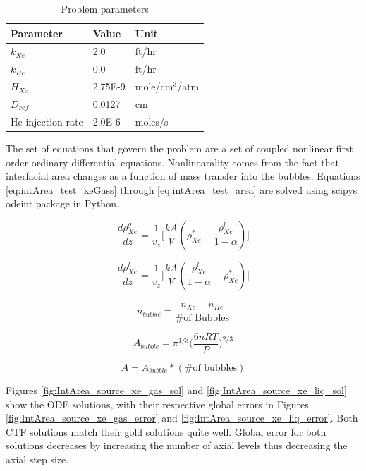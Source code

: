 \begin{table}[htbp!]
   \caption{\label{tab:intArea_test_parameters} Problem parameters}
   \centering
   \begin{tabular}{lll}
   \hline
   \textbf{Parameter} & \textbf{Value} & \textbf{Unit} \\
   \hline 
   $k_{Xe}$ & 2.0 \cite{houtzeel1967} & ft/hr\\ [1ex]
   $k_{He}$ & 0.0 & ft/hr \\ [1ex]
   $H_{Xe}$ & 2.75E-9 \cite{houtzeel1967} & mole/cm${}^{3}$/atm \\ [1ex]
   $D_{ref}$ & 0.0127 \cite{engel1971} & cm \\ [1ex]
   He injection rate & 2.0E-6 & moles/s \\ [1ex]
   \hline
   \end{tabular}
\end{table}

The set of equations that govern the problem are a set of coupled nonlinear first order ordinary differential equations. Nonlinearality comes from the fact that interfacial area changes as a function of mass transfer into the bubbles. Equations \ref{eq:intArea_test_xeGass} through \ref{eq:intArea_test_area} are solved using scipys odeint package in Python. 

\begin{equation}
    \frac{d\rho_{Xe}^{g}}{dz} = \frac{1}{v_{z}}\bigg[\frac{kA}{V}(\rho_{Xe}^{*} - \frac{\rho_{Xe}^{l}}{1-\alpha}) \bigg]
    \label{eq:intArea_test_xeGass}
\end{equation}

\begin{equation}
    \frac{d\rho_{Xe}^{l}}{dz} = \frac{1}{v_{z}}\bigg[\frac{kA}{V}(\frac{\rho_{Xe}^{l}}{1-\alpha} - \rho_{Xe}^{*}) \bigg]
\end{equation}

\begin{equation}
    n_{bubble} = \frac{n_{Xe} + n_{He}}{\text{\# of Bubbles}}
\end{equation}

\begin{equation}
    A_{bubble} = \pi^{1/3}\bigg(\frac{6nRT}{P}\bigg)^{2/3}
\end{equation}

\begin{equation}
    A = A_{bubble} * (\text{\# of bubbles})
    \label{eq:intArea_test_area}
\end{equation}

Figures \ref{fig:IntArea_source_xe_gas_sol} and \ref{fig:IntArea_source_xe_liq_sol} show the ODE solutions, with their respective global errors in Figures \ref{fig:IntArea_source_xe_gas_error} and \ref{fig:IntArea_source_xe_liq_error}. Both CTF solutions match their gold solutions quite well. Global error for both solutions decreases by increasing the number of axial levels thus decreasing the axial step size.  


